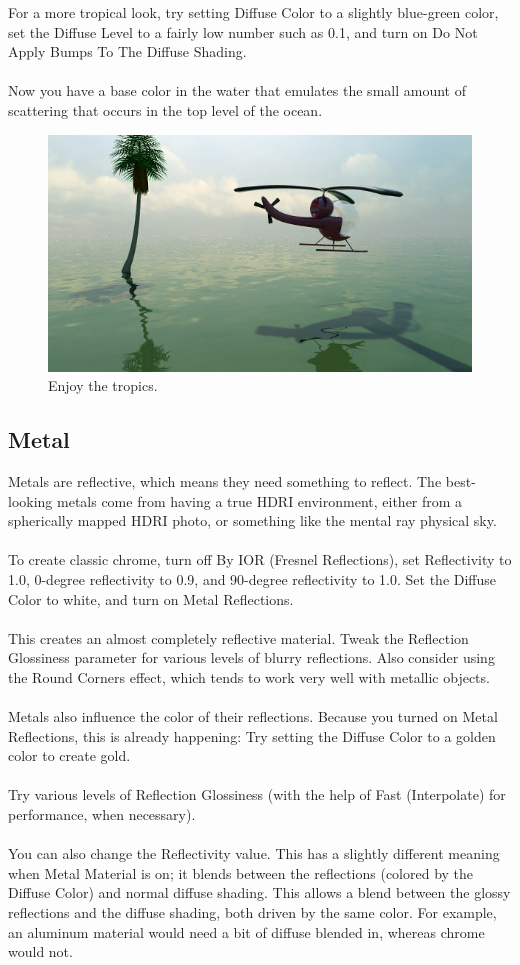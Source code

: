 \documentclass[10pt,a4paper]{article}
\begin{document}
For a more tropical look, try setting Diffuse Color to a slightly blue-green color, set the Diffuse Level to a fairly low number such as 0.1, and turn on Do Not Apply Bumps To The Diffuse Shading.
\\
\\
Now you have a base color in the water that emulates the small amount of scattering that occurs in the top level of the ocean.

\begin{figure}[tbh]
	\centering
	\includegraphics[width=0.5\linewidth]{figure/Enjoy_tropics}
	\caption{Enjoy the tropics.}
	\label{fig:enjoy-the-tropics}
\end{figure}

\subsection{Metal}
Metals are reflective, which means they need something to reflect. The best-looking metals come from having a true HDRI environment, either from a spherically mapped HDRI photo, or something like the mental ray physical sky.
\\
\\
To create classic chrome, turn off By IOR (Fresnel Reflections), set Reflectivity to 1.0, 0-degree reflectivity to 0.9, and 90-degree reflectivity to 1.0. Set the Diffuse Color to white, and turn on Metal Reflections.
\\
\\
This creates an almost completely reflective material. Tweak the Reflection Glossiness parameter for various levels of blurry reflections. Also consider using the Round Corners effect, which tends to work very well with metallic objects.
\\
\\
Metals also influence the color of their reflections. Because you turned on Metal Reflections, this is already happening: Try setting the Diffuse Color to a golden color to create gold.
\\
\\
Try various levels of Reflection Glossiness (with the help of Fast (Interpolate) for performance, when necessary).
\\
\\
You can also change the Reflectivity value. This has a slightly different meaning when Metal Material is on; it blends between the reflections (colored by the Diffuse Color) and normal diffuse shading. This allows a blend between the glossy reflections and the diffuse shading, both driven by the same color. For example, an aluminum material would need a bit of diffuse blended in, whereas chrome would not.
\end{document}
